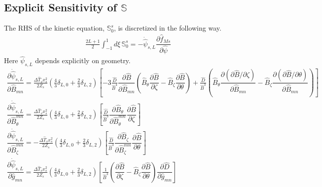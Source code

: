 \documentclass[11pt]{amsart}
\newcommand{\partder}[2]{\dfrac{\partial #1}{\partial #2}} %
\begin{document}
\subsection{Explicit Sensitivity of $\mathbb{S}$}
The RHS of the kinetic equation, $\mathbb{S}_0^s$, is discretized in the following way. 
\begin{gather}
\frac{2L+1}{2} \int_{-1}^1 d\xi \, \mathbb{S}_0^s = - \dot{\hat{\psi}}_{s,L} \partder{\hat{f}_{Ms}}{\hat{\psi}}
\end{gather}
Here $\hat{\psi}_{s,L}$ depends explicitly on geometry.
\begin{gather}
\partder{\dot{\hat{\psi}}_{s,L}}{\hat{B}_{mn}} = \frac{\Delta \hat{T}_s x_s^2}{2 Z_s} \left( \frac{4}{3} \delta_{L,0} + \frac{2}{3} \delta_{L,2} \right) \left[ -3 \frac{\hat{D}}{\hat{B}^4} \partder{\hat{B}}{\hat{B}_{mn}} \left( \hat{B}_{\theta} \partder{\hat{B}}{\zeta} - \hat{B}_{\zeta} \partder{\hat{B}}{\theta} \right) + \frac{\hat{D}}{\hat{B}^3} \left( \hat{B}_{\theta} \partder{(\partial \hat{B}/\partial \zeta)}{\hat{B}_{mn}} - \hat{B}_{\zeta} \partder{(\partial \hat{B}/\partial \theta)}{\hat{B}_{mn}} \right) \right] \\
\partder{\dot{\hat{\psi}}_{s,L}}{\hat{B}_{\theta}^{mn}} = \frac{\Delta \hat{T}_s x_s^2}{2 Z_s} \left( \frac{4}{3} \delta_{L,0} + \frac{2}{3} \delta_{L,2} \right) \left[ \frac{\hat{D}}{\hat{B}^3} \partder{\hat{B}_{\theta}}{\hat{B}_{\theta}^{mn}} \partder{\hat{B}}{\zeta} \right] \\
\partder{\dot{\hat{\psi}}_{s,L}}{\hat{B}_{\zeta}^{mn}} = -\frac{\Delta \hat{T}_s x_s^2}{2 Z_s} \left( \frac{4}{3} \delta_{L,0} + \frac{2}{3} \delta_{L,2} \right) \left[ \frac{\hat{D}}{\hat{B}^3} \partder{\hat{B}_{\zeta}}{\hat{B}_{\zeta}^{mn}} \partder{\hat{B}}{\theta}\right] \\
\partder{\dot{\hat{\psi}}_{s,L}}{\hat{g}_{mn}} = \frac{\Delta \hat{T}_s x_s^2}{2 Z_s} \left( \frac{4}{3} \delta_{L,0} + \frac{2}{3} \delta_{L,2} \right) \left[ \frac{1}{\hat{B}^3} \left( \partder{\hat{B}}{\zeta} - \hat{B}_{\zeta} \partder{\hat{B}}{\theta} \right) \partder{\hat{D}}{\hat{g}_{mn}} \right]
\end{gather}
\end{document}
